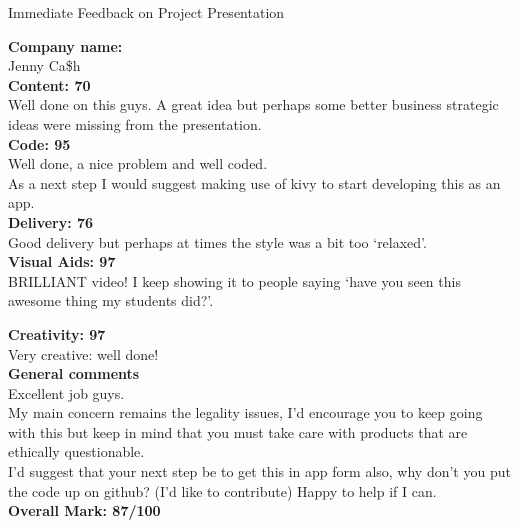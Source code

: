 \documentclass{article}
\begin{document}
\begin{center}
\Huge{Immediate Feedback on Project Presentation}\\
\end{center}


\normalsize
\textbf{Company name:}\\

Jenny Ca\$h \\

\textbf{Content: 70}\\

Well done on this guys.
A great idea but perhaps some better business strategic ideas were missing from the presentation.\\

\textbf{Code: 95}\\

Well done, a nice problem and well coded.\\

As a next step I would suggest making use of kivy to start developing this as an app.\\

\textbf{Delivery: 76}\\

Good delivery but perhaps at times the style was a bit too `relaxed'.\\

\textbf{Visual Aids: 97}\\

BRILLIANT video! I keep showing it to people saying `have you seen this awesome thing my students did?'.

\textbf{Creativity: 97}\\

Very creative: well done!\\


\textbf{General comments}\\

Excellent job guys.\\

My main concern remains the legality issues, I'd encourage you to keep going with this but keep in mind that you must take care with products that are ethically questionable.\\

I'd suggest that your next step be to get this in app form also, why don't you put the code up on github? (I'd like to contribute)
Happy to help if I can.\\

\textbf{Overall Mark: 87/100}
\end{document}
